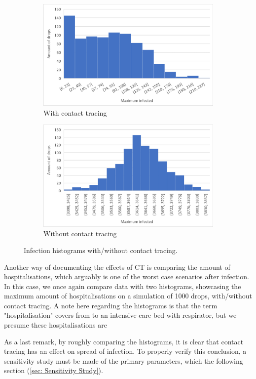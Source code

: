 \begin{figure}[H]
 \centering
  \begin{subfigure}{.45\textwidth}
    \centering
    \includegraphics[width=.95\linewidth]{0_billeder/1k_ct_on_graph.png}
    \caption{With contact tracing}
    \label{Subfig:covid_info_graphA}
  \end{subfigure}
  \begin{subfigure}{.45\textwidth}
    \centering
    \includegraphics[width=.95\linewidth]{0_billeder/1k_ct_off_graph.png}
    \caption{Without contact tracing}
    \label{Subfig:covid_info_graphB}
  \end{subfigure} 
 \caption{Infection histograms with/without contact tracing.}
 \label{Fig:covid_info_graphs}
\end{figure}

Another way of documenting the effects of CT is comparing the amount of hospitalisations, which arguably is one of the worst case scenarios after infection. In this case, we once again compare data with two histograms, showcasing the maximum amount of hospitalisations on a simulation of 1000 drops, with/without contact tracing. 
A note here regarding the histograms is that the term "hospitalisation" covers from  to an intensive care bed with respirator, but we presume these hospitalisations are   

As a last remark, by roughly comparing the histograms, it is clear that contact tracing has an effect on spread of infection. To properly verify this conclusion, a sensitivity study must be made of the primary parameters, which the following section (\ref{sec: Sensitivity Study}).